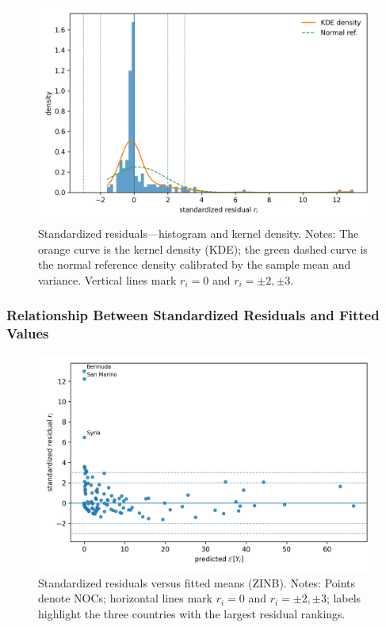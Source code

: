 \documentclass[11pt,twoside]{article}
\numberwithin{Theorem}{section}
\numberwithin{Definition}{section}
\numberwithin{Lemma}{section}
\numberwithin{Algorithm}{section}
\numberwithin{equation}{section}
\begin{document}
\begin{figure}[H]
  \centering
  \includegraphics[width=0.92\linewidth]{fig_resid_hist.png}
  \caption{Standardized residuals—histogram and kernel density.
  Notes: The orange curve is the kernel density (KDE); the green dashed curve is the
  normal reference density calibrated by the sample mean and variance. Vertical
  lines mark $r_i=0$ and $r_i=\pm2,\pm3$.}
  \label{fig:resid_hist}
\end{figure}

\subsubsection{Relationship Between Standardized Residuals and Fitted Values}

\begin{figure}[H]
  \centering
  \includegraphics[width=0.92\linewidth]{fig_resid_vs_pred.png}
  \caption{Standardized residuals versus fitted means (ZINB).
  Notes: Points denote NOCs; horizontal lines mark $r_i=0$ and $r_i=\pm2,\pm3$; labels highlight the three countries with the largest residual rankings.}
  \label{fig:resid_vs_pred}
\end{figure}
\end{document}
